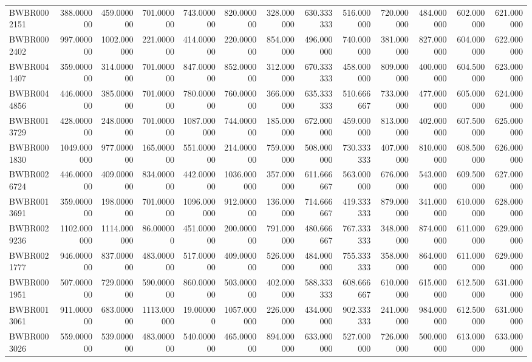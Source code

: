 \begin{longtable}{lrrrrrrrrrrrr}
BWBR0002151 & 388.000000 & 459.000000 & 701.000000 & 743.000000 & 820.000000 & 328.000000 & 630.333333 & 516.000000 & 720.000000 & 484.000000 & 602.000000 & 621.000000 \\
BWBR0002402 & 997.000000 & 1002.000000 & 221.000000 & 414.000000 & 220.000000 & 854.000000 & 496.000000 & 740.000000 & 381.000000 & 827.000000 & 604.000000 & 622.000000 \\
BWBR0041407 & 359.000000 & 314.000000 & 701.000000 & 847.000000 & 852.000000 & 312.000000 & 670.333333 & 458.000000 & 809.000000 & 400.000000 & 604.500000 & 623.000000 \\
BWBR0044856 & 446.000000 & 385.000000 & 701.000000 & 780.000000 & 760.000000 & 366.000000 & 635.333333 & 510.666667 & 733.000000 & 477.000000 & 605.000000 & 624.000000 \\
BWBR0013729 & 428.000000 & 248.000000 & 701.000000 & 1087.000000 & 744.000000 & 185.000000 & 672.000000 & 459.000000 & 813.000000 & 402.000000 & 607.500000 & 625.000000 \\
BWBR0001830 & 1049.000000 & 977.000000 & 165.000000 & 551.000000 & 214.000000 & 759.000000 & 508.000000 & 730.333333 & 407.000000 & 810.000000 & 608.500000 & 626.000000 \\
BWBR0026724 & 446.000000 & 409.000000 & 834.000000 & 442.000000 & 1036.000000 & 357.000000 & 611.666667 & 563.000000 & 676.000000 & 543.000000 & 609.500000 & 627.000000 \\
BWBR0013691 & 359.000000 & 198.000000 & 701.000000 & 1096.000000 & 912.000000 & 136.000000 & 714.666667 & 419.333333 & 879.000000 & 341.000000 & 610.000000 & 628.000000 \\
BWBR0029236 & 1102.000000 & 1114.000000 & 86.000000 & 451.000000 & 200.000000 & 791.000000 & 480.666667 & 767.333333 & 348.000000 & 874.000000 & 611.000000 & 629.000000 \\
BWBR0021777 & 946.000000 & 837.000000 & 483.000000 & 517.000000 & 409.000000 & 526.000000 & 484.000000 & 755.333333 & 358.000000 & 864.000000 & 611.000000 & 629.000000 \\
BWBR0001951 & 507.000000 & 729.000000 & 590.000000 & 860.000000 & 503.000000 & 402.000000 & 588.333333 & 608.666667 & 610.000000 & 615.000000 & 612.500000 & 631.000000 \\
BWBR0013061 & 911.000000 & 683.000000 & 1113.000000 & 19.000000 & 1057.000000 & 226.000000 & 434.000000 & 902.333333 & 241.000000 & 984.000000 & 612.500000 & 631.000000 \\
BWBR0003026 & 559.000000 & 539.000000 & 483.000000 & 540.000000 & 465.000000 & 894.000000 & 633.000000 & 527.000000 & 726.000000 & 500.000000 & 613.000000 & 633.000000 \\

\end{longtable}

